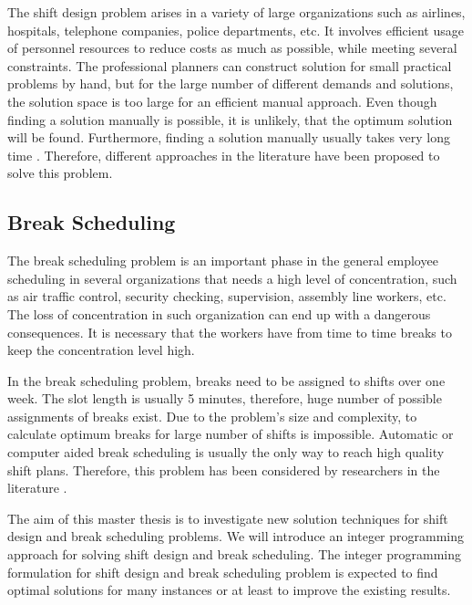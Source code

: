 The shift design problem arises in a variety of large organizations such as airlines, hospitals, telephone companies, police departments, etc. It involves efficient usage of personnel resources to reduce costs  as much as possible, while meeting several constraints. The professional planners can construct solution for small practical problems by hand, but for the large number of different demands and solutions, the solution space is too large for an efficient manual approach. Even though finding a solution manually is possible, it is unlikely, that the optimum solution will be found. Furthermore, finding a solution manually usually takes very long time \cite{li:2013:gaspero}. Therefore, different approaches in the literature \cite{li:2004:musliu} \cite{li:2007:gaspero} \cite{li:2013:gaspero} \cite{li:2010:abseher} have been proposed to solve this problem.

\subsection{Break Scheduling}

The break scheduling problem is an important phase in the general employee scheduling in several organizations that needs a high level of concentration, such as air traffic control, security checking, supervision, assembly line workers, etc. The loss of concentration in such organization can end up with a dangerous consequences. It is necessary that the workers have from time to time breaks to keep the concentration level high. 

In the break scheduling problem, breaks need to be assigned to shifts over one week. The slot length is usually 5 minutes, therefore, huge number of possible assignments of breaks exist. Due to the problem's size and complexity, to calculate optimum breaks for large number of shifts is impossible. Automatic or computer aided break scheduling is usually the only way to reach high quality shift plans. Therefore, this problem has been considered by researchers in the literature \cite{li:2008:beer} \cite{li:2010:beer} \cite{li:2014:widl}.

The aim of this master thesis is to investigate new solution techniques for shift design and break scheduling problems. We will introduce an integer programming approach for solving shift design and break scheduling. The integer programming formulation for shift design and break scheduling problem is expected to find optimal solutions for many instances or at least to improve the existing results.


